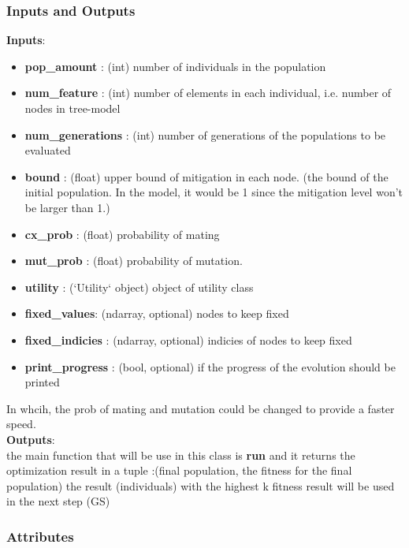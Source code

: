 \documentclass[12pt]{article}
\begin{document}
\subsubsection{Inputs and Outputs}
\textbf{Inputs}:
\begin{itemize}
  \item 	\textbf{pop\_amount }: (int)
		number of individuals in the population
  \item 	\textbf{num\_feature} : (int)
		number of elements in each individual, i.e. number of nodes in tree-model
  \item \textbf{num\_generations} : (int)
		number of generations of the populations to be evaluated
  \item \textbf{bound} : (float)
		upper bound of mitigation in each node. (the bound of the initial population. In the model, it would be 1 since the mitigation level won't be larger than 1.)
  \item 	\textbf{cx\_prob} : (float)
		probability of mating
  \item 	\textbf{mut\_prob} : (float)
		probability of mutation.
  \item \textbf{utility} : (`Utility` object)
		object of utility class
  \item 	\textbf{fixed\_values}: (ndarray, optional)
		nodes to keep fixed
  \item 	\textbf{fixed\_indicies} : (ndarray, optional)
		indicies of nodes to keep fixed
  \item 	\textbf{print\_progress} : (bool, optional)
		if the progress of the evolution should be printed
\end{itemize}
In whcih, the prob of mating and mutation could be changed to provide a faster speed.\\
\textbf{Outputs}:\\
the main function that will be use in this class is \textbf{run} and it returns the optimization result in a tuple :(final population, the fitness for the final population)
the result (individuals) with the highest k fitness result will be used in the next step (GS)

\subsubsection{Attributes}
	
\end{document}
